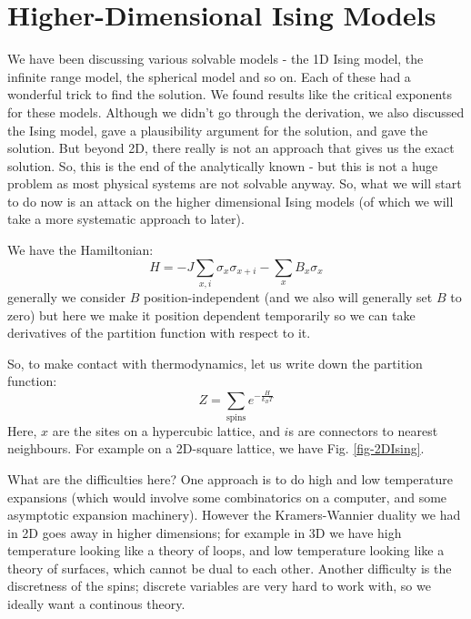 \section{Higher-Dimensional Ising Models}


We have been discussing various solvable models - the 1D Ising model, the infinite range model, the spherical model and so on. Each of these had a wonderful trick to find the solution. We found results like the critical exponents for these models. Although we didn't go through the derivation, we also discussed the Ising model, gave a plausibility argument for the solution, and gave the solution. But beyond 2D, there really is not an approach that gives us the exact solution. So, this is the end of the analytically known - but this is not a huge problem as most physical systems are not solvable anyway. So, what we will start to do now is an attack on the higher dimensional Ising models (of which we will take a more systematic approach to later).

We have the Hamiltonian:
\begin{equation}
    H = -J\sum_{x, i}\sigma_x\sigma_{x+i} - \sum_x B_x\sigma_x
\end{equation}
generally we consider $B$ position-independent (and we also will generally set $B$ to zero) but here we make it position dependent temporarily so we can take derivatives of the partition function with respect to it.

So, to make contact with thermodynamics, let us write down the partition function:
\begin{equation}
    Z = \sum_{\text{spins}} e^{-\frac{H}{k_B T}}
\end{equation}
Here, $x$ are the sites on a hypercubic lattice, and $i$s are connectors to nearest neighbours. For example on a 2D-square lattice, we have Fig. \ref{fig-2DIsing}.

What are the difficulties here? One approach is to do high and low temperature expansions (which would involve some combinatorics on a computer, and some asymptotic expansion machinery). However the Kramers-Wannier duality we had in 2D goes away in higher dimensions; for example in 3D we have high temperature looking like a theory of loops, and low temperature looking like a theory of surfaces, which cannot be dual to each other. Another difficulty is the discretness of the spins; discrete variables are very hard to work with, so we ideally want a continous theory.

